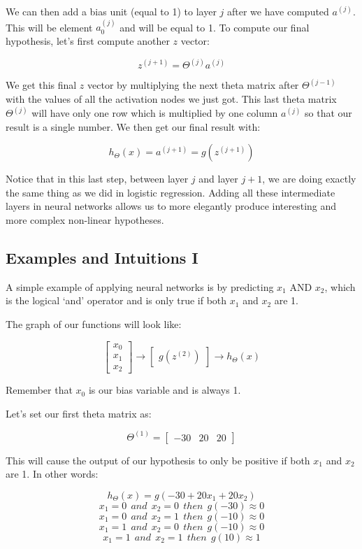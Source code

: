\documentclass[UTF8]{article}
\begin{document}
We can then add a bias unit (equal to 1) to layer $j$ after we have computed $a^{(j)}$. This will be element $a^{(j)}_0$ and will be equal to 1. To compute our final hypothesis, let's first compute another $z$ vector:

\[z^{(j+1)} = \Theta^{(j)}a^{(j)}\]

We get this final $z$ vector by multiplying the next theta matrix after $\Theta^{(j-1)}$ with the values of all the activation nodes we just got. This last theta matrix $\Theta^{(j)}$ will have only one row which is multiplied by one column $a^{(j)}$ so that our result is a single number. We then get our final result with:

\[h_\Theta(x) = a^{(j+1)} = g(z^{(j+1)})\]

Notice that in this last step, between layer $j$ and layer $j+1$, we are doing exactly the same thing as we did in logistic regression. Adding all these intermediate layers in neural networks allows us to more elegantly produce interesting and more complex non-linear hypotheses.

\subsection{Examples and Intuitions I}

A simple example of applying neural networks is by predicting $x_1$ AND $x_2$, which is the logical `and' operator and is only true if both $x_1$ and $x_2$ are 1.

The graph of our functions will look like:

\[\begin{bmatrix}x_0 \\ x_1 \\ x_2\end{bmatrix} \rightarrow\begin{bmatrix}g(z^{(2)})\end{bmatrix} \rightarrow h_\Theta(x)\]

Remember that $x_0$ is our bias variable and is always 1.

Let's set our first theta matrix as:

\[\Theta^{(1)} =\begin{bmatrix}-30 & 20 & 20\end{bmatrix}\]

This will cause the output of our hypothesis to only be positive if both $x_1$ and $x_2$ are 1. In other words:

\[h_\Theta(x) = g(-30 + 20x_1 + 20x_2) \]
\[ x_1 = 0 \ \ and \ \ x_2 = 0 \ \ then \ \ g(-30) \approx 0 \]
\[ x_1 = 0 \ \ and \ \ x_2 = 1 \ \ then \ \ g(-10) \approx 0 \]
\[ x_1 = 1 \ \ and \ \ x_2 = 0 \ \ then \ \ g(-10) \approx 0 \]
\[ x_1 = 1 \ \ and \ \ x_2 = 1 \ \ then \ \ g(10) \approx 1\]
\end{document}

